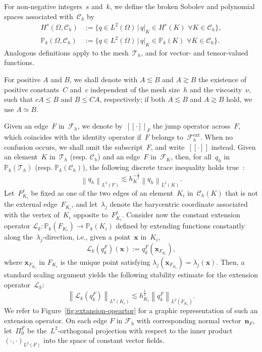 \documentclass[a4paper,twoside,10pt]{article}
\theoremstyle{plain}
\theoremstyle{remark}
\theoremstyle{definition}
\numberwithin{equation}{section}
\numberwithin{figure}{section}
\newcommand{\Norm}[1]{{\left\|{#1} \right\|}}
\newcommand{\jump}[1]{\left[\!\left[#1\right]\!\right]}
\newcommand{\Pbbk}{\mathbb{P}_k}
\newcommand{\Ccalh}{\mathcal{C}_h}
\newcommand{\Tauh}{\mathcal{T}_h}
\newcommand{\K}{K}
\newcommand{\F}{F}
\newcommand{\qh}{q_h}
\newcommand{\Ltwo}{L^2}
\newcommand{\LtwoOmega}{\Ltwo(\Omega)}
\newcommand{\Fcalh}{\mathcal{F}_h}
\newcommand{\FcalK}{\mathcal{F}_\K}
\newcommand{\xbf}{\mathbf{x}}
\newcommand{\CcalhK}{\Ccalh(\K)}
\newcommand{\qkF}{q^\F_{k}}
\newcommand{\Ki}{{\K_i}}
\newcommand{\Fi}{{\F_{\Ki}}}
\newcommand{\Fj}{\F_{\Ki}^j}
\newcommand{\hK}{h_\K}
\newcommand{\hKi}{h_{\Ki}}
\newcommand{\nbfF}{\mathbf{n}_\F}
\newcommand{\FcalhB}{\mathcal{F}_h^{\text{ext}}}
\newcommand{\PizF}{\Pi_0^{\F}}
\newcommand{\Lcalk}{\mathcal{L}_k}
\newcommand{\lambdaj}{\lambda_j}
\begin{document}
For non-negative integers~$s$ and~$k$,
we define the broken Sobolev and polynomial spaces associated with~$\Ccalh$ by
\begin{align*}
H^s(\Omega,\Ccalh) &:= \{ q \in \LtwoOmega \, | \, q|_{\K} \in H^s(\K)\,\, \forall\K\in\Ccalh \}, \\
\Pbbk(\Omega,\Ccalh) &:= \{ q \in \LtwoOmega \, | \, q|_{\K} \in \Pbbk(\K)\,\, \forall\K\in\Ccalh \}.
\end{align*}
Analogous definitions apply to the mesh~$\Tauh$,
and for vector- and tensor-valued functions.

For positive $A$ and $B$,
we shall denote with
$A\lesssim B$ and $A \gtrsim B$
the existence of positive constants~$C$ and~$c$
independent of the mesh size~$h$ and the viscosity~$\nu$,
such that
$c A \leq B$ and $B \leq C A$, respectively;
if both $A\lesssim B$ and $A \gtrsim B$ hold,
we use $A \simeq B$.

Given an edge~$\F$ in~$\Fcalh$,
we denote by~$\jump{\cdot}_{\F}$ the jump operator across~$\F$,
which coincides with the identity operator if~$\F$ belongs to~$\FcalhB$.
When no confusion occurs, we shall omit the subscript~$\F$,
and write~$\jump{\cdot}$ instead.
Given an element~$\K$ in~$\Tauh$ (resp. $\Ccalh$)
and an edge~$\F$ in~$\FcalK$,
then,
for all~$\qh$ in~$\Pbbk(\Tauh)$ (resp. $\Pbbk(\Ccalh)$),
the following discrete trace inequality holds true~\cite[Lem.~1.46]{DiPietro-Ern:2012}:
\begin{equation} \label{trace-inequality}
\Norm{\qh}_{\Ltwo(\F)} \lesssim \hK^{-\frac12} \Norm{\qh}_{\Ltwo(\K)}.
\end{equation}
Let~$\Fj$ be fixed as one of the two edges of an element~$\Ki$ in~$\CcalhK$
that is not the external edge~$\Fi$,
and let~$\lambda_j$
denote the barycentric coordinate associated with
the vertex of~$\Ki$ opposite to~$\Fj$.
Consider now the constant extension operator
$\Lcalk:\Pbbk(\Fi) \to \Pbbk(\Ki)$
defined by
extending functions constantly along the~$\lambdaj$-direction, i.e.,
given a point~$\xbf$ in~$\Ki$,
\begin{equation} \label{Lcal}
\Lcalk(\qkF)(\xbf) := \qkF(\xbf_{\Fi}),
\end{equation}
where $\xbf_{\Fi}$ in $\Fi$
is the unique point satisfying
 $\lambdaj(\xbf_{\Fi}) = \lambdaj(\xbf)$.
Then, a standard scaling argument yields
the following stability estimate for the extension operator~$\Lcalk$:
\begin{equation} \label{stability-Lcal}
\Norm{\Lcalk(\qkF)}_{\Ltwo(\Ki)}
\lesssim \hKi^{\frac12} \Norm{\qkF}_{\Ltwo(\Fi)}.
\end{equation}
We refer to Figure~\ref{fig:extansion-opeartor}
for a graphic representation of such an extension operator.
On each edge $\F$ in $\Fcalh$
with corresponding normal vector~$\nbfF$,
let~$\PizF$ be the~$\Ltwo$-orthogonal projection
with respect to the inner product~$(\cdot,\cdot)_{\Ltwo(\F)}$
into the space of constant vector fields.
\end{document}
